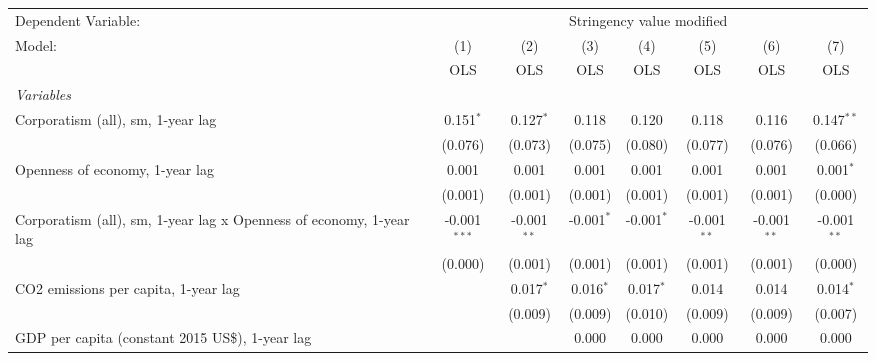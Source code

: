 
\begingroup
\centering
\begin{tabular}{lccccccc}
   \toprule
   Dependent Variable: & \multicolumn{7}{c}{Stringency value modified}\\
   Model:                                                              & (1)            & (2)           & (3)          & (4)          & (5)           & (6)           & (7)\\  
                                                                       &  OLS           & OLS           & OLS          & OLS          & OLS           & OLS           & OLS\\  
   \midrule
   \emph{Variables}\\
   Corporatism (all), sm, 1-year lag                                   & 0.151$^{*}$    & 0.127$^{*}$   & 0.118        & 0.120        & 0.118         & 0.116         & 0.147$^{**}$\\   
                                                                       & (0.076)        & (0.073)       & (0.075)      & (0.080)      & (0.077)       & (0.076)       & (0.066)\\   
   Openness of economy, 1-year lag                                     & 0.001          & 0.001         & 0.001        & 0.001        & 0.001         & 0.001         & 0.001$^{*}$\\   
                                                                       & (0.001)        & (0.001)       & (0.001)      & (0.001)      & (0.001)       & (0.001)       & (0.000)\\   
   Corporatism (all), sm, 1-year lag x Openness of economy, 1-year lag & -0.001$^{***}$ & -0.001$^{**}$ & -0.001$^{*}$ & -0.001$^{*}$ & -0.001$^{**}$ & -0.001$^{**}$ & -0.001$^{**}$\\   
                                                                       & (0.000)        & (0.001)       & (0.001)      & (0.001)      & (0.001)       & (0.001)       & (0.000)\\   
   CO2 emissions per capita, 1-year lag                                &                & 0.017$^{*}$   & 0.016$^{*}$  & 0.017$^{*}$  & 0.014         & 0.014         & 0.014$^{*}$\\   
                                                                       &                & (0.009)       & (0.009)      & (0.010)      & (0.009)       & (0.009)       & (0.007)\\   
   GDP per capita (constant 2015 US\$), 1-year lag                     &                &               & 0.000        & 0.000        & 0.000         & 0.000         & 0.000\\   

\end{tabular}
